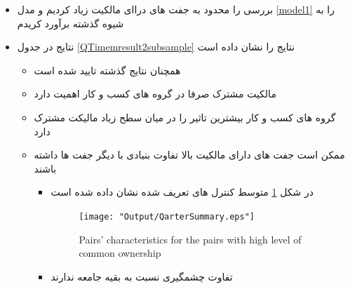 \documentclass[12pt, a4paper]{article}
\begin{document}
\begin{itemize}
	\item
	بررسی را محدود به جفت های دراای مالکیت زیاد کردیم و مدل 
	\ref{model1}
	را به شیوه گذشته برآورد کریدم
	\item
	نتایج در جدول 
	 \ref{QTimemresult2subsample}
	 نتایج را نشان داده است
	\begin{itemize}
		\item 
		همچنان نتایج گذشته تایید شده است
		\item 
	مالکیت مشترک صرفا در گروه های کسب و کار اهمیت دارد 
		\item 
		گروه های کسب و کار بیشترین تاثیر را در میان سطح زیاد مالیکت مشترک دارد
		\item 
		ممکن است جفت های دارای مالکیت بالا تفاوت بنیادی با دیگر جفت ها داشته باشند 
		\begin{itemize}
			\item 
			در شکل 
			\ref{QarterSummary}
			متوسط کنترل های تعریف شده نشان داده شده است
			\begin{figure}[htbp]
				\centering  
				\texttt{[image: "Output/QarterSummary.eps"]}
				\caption{Pairs' characteristics for the pairs with high level of common ownership}
				\label{QarterSummary}
			\end{figure}
		\item
		تفاوت چشمگیری نسبت به بقیه جامعه ندارند
		\end{itemize}
	\end{itemize}
	
	
\end{itemize}


\FloatBarrier
\end{document}
